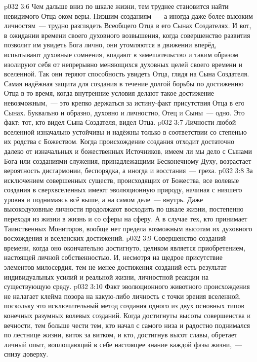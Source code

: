 \vs p032 3:6 Чем дальше вниз по шкале жизни, тем труднее становится найти невидимого Отца оком веры. Низшим созданиям~--- а иногда даже более высоким личностям~--- трудно разглядеть Всеобщего Отца в его Сынах Создателях. И вот, в ожидании времени своего духовного возвышения, когда совершенство развития позволит им увидеть Бога лично, они утомляются в движении вперёд, испытывают духовные сомнения, впадают в замешательство и таким образом изолируют себя от непрерывно меняющихся духовных целей своего времени и вселенной. Так они теряют способность увидеть Отца, глядя на Сына Создателя. Самая надёжная защита для создания в течение долгой борьбы по достижению Отца в то время, когда внутренние условия делают такое достижение невозможным,~--- это крепко держаться за истину\hyp{}факт присутствия Отца в его Сынах. Буквально и образно, духовно и личностно, Отец и Сыны~--- одно. Это факт: тот, кто видел Сына Создателя, видел Отца.
\vs p032 3:7 \pc Личности любой вселенной изначально устойчивы и надёжны только в соответствии со степенью их родства с Божеством. Когда происхождение создания отходит достаточно далеко от изначальных и божественных Источников, имеем ли мы дело с Сынами Бога или созданиями служения, принадлежащими Бесконечному Духу, возрастает вероятность дисгармонии, беспорядка, а иногда и восстания~--- греха.
\vs p032 3:8 \pc За исключением совершенных существ, происходящих от Божества, все волевые создания в сверхвселенных имеют эволюционную природу, начиная с низшего уровня и поднимаясь всё выше, а на самом деле~--- внутрь. Даже высокодуховные личности продолжают восходить по шкале жизни, постепенно переходя из жизни в жизнь и со сферы на сферу. А в случае тех, кто принимает Таинственных Мониторов, вообще нет предела возможным высотам их духовного восхождения и вселенских достижений.
\vs p032 3:9 Совершенство созданий времени, когда оно окончательно достигнуто, целиком является приобретением, настоящей личной собственностью. И, несмотря на щедрое присутствие элементов милосердия, тем не менее достижения созданий есть результат индивидуальных усилий и реальной жизни, личностной реакции на существующую среду.
\vs p032 3:10 Факт эволюционного животного происхождения не налагает клейма позора на какую\hyp{}либо личность с точки зрения вселенной, поскольку это исключительный метод создания одного из двух основных типов конечных разумных волевых созданий. Когда достигнуты высоты совершенства и вечности, тем больше чести тем, кто начал с самого низа и радостно поднимался по лестнице жизни, виток за витком, и кто, достигнув высот славы, обретает личный опыт, воплощающий в себе настоящее знание каждой фазы жизни,~--- снизу доверху.
